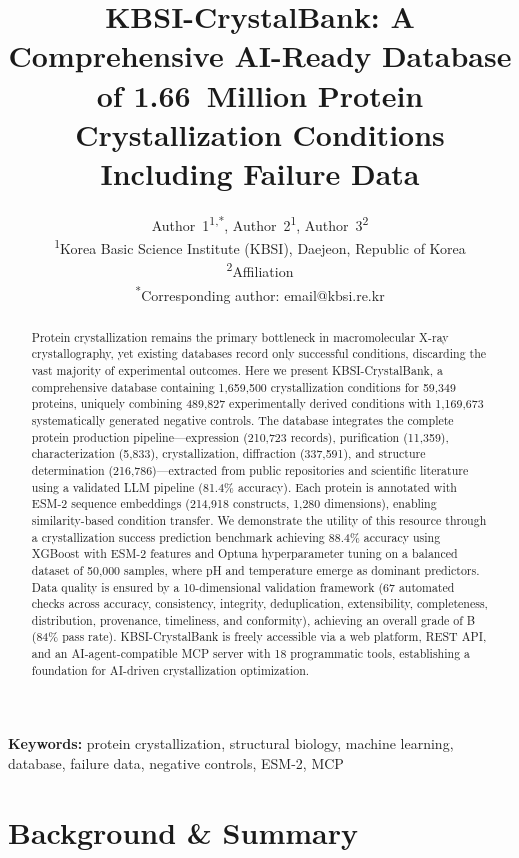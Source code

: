 \documentclass[11pt]{article}
\title{\textbf{KBSI-CrystalBank: A Comprehensive AI-Ready Database of 1.66~Million Protein Crystallization Conditions Including Failure Data}}
\author{
  Author~1\textsuperscript{1,*},
  Author~2\textsuperscript{1},
  Author~3\textsuperscript{2} \\[6pt]
  \textsuperscript{1}Korea Basic Science Institute (KBSI), Daejeon, Republic of Korea \\
  \textsuperscript{2}Affiliation \\[4pt]
  \textsuperscript{*}Corresponding author: email@kbsi.re.kr
}
\date{}
\begin{document}
\maketitle

\begin{abstract}
Protein crystallization remains the primary bottleneck in macromolecular X-ray crystallography, yet existing databases record only successful conditions, discarding the vast majority of experimental outcomes. Here we present KBSI-CrystalBank, a comprehensive database containing 1,659,500 crystallization conditions for 59,349 proteins, uniquely combining 489,827 experimentally derived conditions with 1,169,673 systematically generated negative controls. The database integrates the complete protein production pipeline---expression (210,723 records), purification (11,359), characterization (5,833), crystallization, diffraction (337,591), and structure determination (216,786)---extracted from public repositories and scientific literature using a validated LLM pipeline (81.4\% accuracy). Each protein is annotated with ESM-2 sequence embeddings (214,918 constructs, 1,280 dimensions), enabling similarity-based condition transfer. We demonstrate the utility of this resource through a crystallization success prediction benchmark achieving 88.4\% accuracy using XGBoost with ESM-2 features and Optuna hyperparameter tuning on a balanced dataset of 50,000 samples, where pH and temperature emerge as dominant predictors. Data quality is ensured by a 10-dimensional validation framework (67 automated checks across accuracy, consistency, integrity, deduplication, extensibility, completeness, distribution, provenance, timeliness, and conformity), achieving an overall grade of B (84\% pass rate). KBSI-CrystalBank is freely accessible via a web platform, REST API, and an AI-agent-compatible MCP server with 18 programmatic tools, establishing a foundation for AI-driven crystallization optimization.
\end{abstract}

\noindent\textbf{Keywords:} protein crystallization, structural biology, machine learning, database, failure data, negative controls, ESM-2, MCP

\section*{Background \& Summary}
\end{document}
